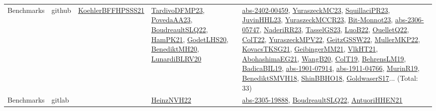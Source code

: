 {\begin{longtable}{lp{3cm}>{\raggedright}p{6cm}>{\raggedright}p{6cm}p{8cm}}
Benchmarks & github & \href{articles/KoehlerBFFHPSSS21.pdf}{KoehlerBFFHPSSS21}\cite{KoehlerBFFHPSSS21} & \href{papers/TardivoDFMP23.pdf}{TardivoDFMP23}\cite{TardivoDFMP23}, \href{papers/PovedaAA23.pdf}{PovedaAA23}\cite{PovedaAA23}, \href{papers/BoudreaultSLQ22.pdf}{BoudreaultSLQ22}\cite{BoudreaultSLQ22}, \href{articles/HamPK21.pdf}{HamPK21}\cite{HamPK21}, \href{papers/GodetLHS20.pdf}{GodetLHS20}\cite{GodetLHS20}, \href{articles/BenediktMH20.pdf}{BenediktMH20}\cite{BenediktMH20}, \href{articles/LunardiBLRV20.pdf}{LunardiBLRV20}\cite{LunardiBLRV20} & \href{articles/abs-2402-00459.pdf}{abs-2402-00459}\cite{abs-2402-00459}, \href{papers/YuraszeckMC23.pdf}{YuraszeckMC23}\cite{YuraszeckMC23}, \href{papers/SquillaciPR23.pdf}{SquillaciPR23}\cite{SquillaciPR23}, \href{papers/JuvinHHL23.pdf}{JuvinHHL23}\cite{JuvinHHL23}, \href{articles/YuraszeckMCCR23.pdf}{YuraszeckMCCR23}\cite{YuraszeckMCCR23}, \href{papers/Bit-Monnot23.pdf}{Bit-Monnot23}\cite{Bit-Monnot23}, \href{articles/abs-2306-05747.pdf}{abs-2306-05747}\cite{abs-2306-05747}, \href{articles/NaderiRR23.pdf}{NaderiRR23}\cite{NaderiRR23}, \href{papers/TasselGS23.pdf}{TasselGS23}\cite{TasselGS23}, \href{papers/LuoB22.pdf}{LuoB22}\cite{LuoB22}, \href{papers/OuelletQ22.pdf}{OuelletQ22}\cite{OuelletQ22}, \href{articles/ColT22.pdf}{ColT22}\cite{ColT22}, \href{articles/YuraszeckMPV22.pdf}{YuraszeckMPV22}\cite{YuraszeckMPV22}, \href{papers/GeitzGSSW22.pdf}{GeitzGSSW22}\cite{GeitzGSSW22}, \href{articles/MullerMKP22.pdf}{MullerMKP22}\cite{MullerMKP22}, \href{papers/KovacsTKSG21.pdf}{KovacsTKSG21}\cite{KovacsTKSG21}, \href{papers/GeibingerMM21.pdf}{GeibingerMM21}\cite{GeibingerMM21}, \href{articles/VlkHT21.pdf}{VlkHT21}\cite{VlkHT21}, \href{articles/AbohashimaEG21.pdf}{AbohashimaEG21}\cite{AbohashimaEG21}, \href{papers/WangB20.pdf}{WangB20}\cite{WangB20}, \href{papers/ColT19.pdf}{ColT19}\cite{ColT19}, \href{papers/BehrensLM19.pdf}{BehrensLM19}\cite{BehrensLM19}, \href{papers/BadicaBIL19.pdf}{BadicaBIL19}\cite{BadicaBIL19}, \href{articles/abs-1901-07914.pdf}{abs-1901-07914}\cite{abs-1901-07914}, \href{articles/abs-1911-04766.pdf}{abs-1911-04766}\cite{abs-1911-04766}, \href{papers/MurinR19.pdf}{MurinR19}\cite{MurinR19}, \href{papers/BenediktSMVH18.pdf}{BenediktSMVH18}\cite{BenediktSMVH18}, \href{articles/ShinBBHO18.pdf}{ShinBBHO18}\cite{ShinBBHO18}, \href{papers/GoldwaserS17.pdf}{GoldwaserS17}\cite{GoldwaserS17}... (Total: 33)\\
Benchmarks & gitlab &  & \href{articles/HeinzNVH22.pdf}{HeinzNVH22}\cite{HeinzNVH22} & \href{articles/abs-2305-19888.pdf}{abs-2305-19888}\cite{abs-2305-19888}, \href{papers/BoudreaultSLQ22.pdf}{BoudreaultSLQ22}\cite{BoudreaultSLQ22}, \href{papers/AntuoriHHEN21.pdf}{AntuoriHHEN21}\cite{AntuoriHHEN21}\\

\end{longtable}}
